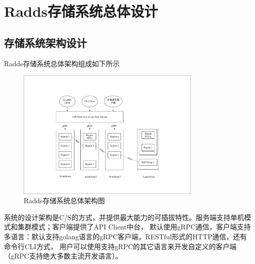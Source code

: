 \section{Radds存储系统总体设计}

	\subsection{存储系统架构设计}

	Radds存储系统总体架构组成如下所示
	
	\begin{figure}[H]
		\centering
		\includegraphics[width=0.80\textwidth]{pdf/radds_system_arch.pdf}
		\caption{Radds存储系统总体架构图}
		\label{overall_structure}
	\end{figure}

		系统的设计架构是C/S的方式，并提供最大能力的可插拔特性。服务端支持单机模式和集群模式；客户端提供了API Client中台，
		默认使用gRPC通信，客户端支持多语言：默认支持golang语言的gRPC客户端，RESTful形式的HTTP通信，还有命令行CLI方式，
		用户可以使用支持gRPC的其它语言来开发自定义的客户端（gRPC支持绝大多数主流开发语言）。
		

